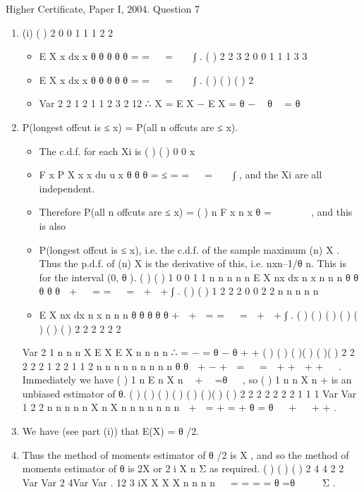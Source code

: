 \documentclass[a4paper,12pt]{article}
\begin{document}
Higher Certificate, Paper I, 2004. Question 7

\begin{enumerate}
\item (i) ( ) 2
0
0
1 1 1
2 2

\begin{itemize}
    \item E X x dx x
θ
θ θ
θ θ
= =   =   ∫ .
( ) 2
2 3 2
0
0
1 1 1
3 3
\item E X x dx x
θ
θ θ
θ θ
= =   =   ∫ .
( ) ( ) { ( )}
2
\item Var 2 2 1 2 1 1 2
3 2 12
∴ X = E X − E X = θ −  θ  = θ
 
\end{itemize}
\item  P(longest offcut is ≤ x) = P(all n offcuts are ≤ x).
\begin{itemize}
    \item The c.d.f. for each Xi is ( ) ( ) 0
0
x
\item F x P X x x du u x
θ θ θ
= ≤ = =   =   ∫ , and the Xi are all
independent. 
\item Therefore P(all n offcuts are ≤ x) = { ( )}
n
F x n x
θ
=    
 
, and this is also
\item P(longest offcut is ≤ x), i.e. the c.d.f. of the sample maximum (n) X . Thus the p.d.f. of
(n) X is the derivative of this, i.e. nxn–1/θ n. This is for the interval (0, θ ).
( ) ( ) 1
0
0 1 1
n n
n n n
E X nx dx n x n
n n
θ
θ θ
θ θ
 + 
∴ = =   =  +  + ∫ .
( ) ( ) 1 2 2
2
0
0 2 2
n n
n n n
\item E X nx dx n x n
n n
θ
θ θ
θ θ
+  + 
= =   =  +  + ∫ .
( ) ( ) ( ) ( ) ( ) { ( )} ( )
2 2 2 2
2
2 
\end{itemize}
Var
2 1 n n n
X E X E X n n
n n
∴ = − = θ − θ
+ +
( ) ( )
( )( ) ( )( )
2 2
2
2 2
1 2
2 1 1 2
n n n n n
n n n n
θ θ
 + − + 
=   =
 + +  + +  
.
Immediately we have ( )
1
n
E n X
n
 +  =θ
 
, so ( )
1
n
n X
n
+ is an unbiased estimator of θ.
( ) ( )
( ) ( ) ( )
( )( ) ( )
2 2 2 2
2 2 2
1 1 1 Var Var
1 2 2 n
n n n n X n X
n n n n n n n
 +  = + = + θ = θ   +   + +
.
\item We have (see part (i)) that E(X) = θ /2. 
\item Thus the method of moments estimator
of θ /2 is X , and so the method of moments estimator of θ is 2X or 2
i X
n Σ as
required.
( ) ( ) ( )
2 4 4 2 2 Var Var 2 4Var Var .
12 3 iX X X X
n n n n
  = = = = θ =θ  
  Σ .
\end{enumerate}
\end{document}
